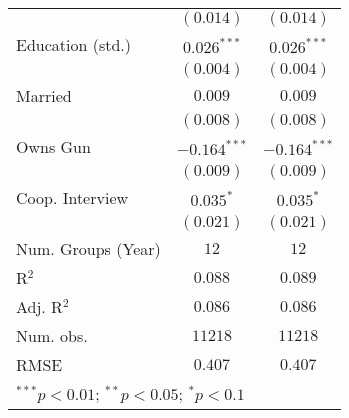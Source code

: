 \begin{table}
\begin{center}
\begin{tabular}{l c c}
                        & $(0.014)$      & $(0.014)$      \\
Education (std.)        & $0.026^{***}$  & $0.026^{***}$  \\
                        & $(0.004)$      & $(0.004)$      \\
Married                 & $0.009$        & $0.009$        \\
                        & $(0.008)$      & $(0.008)$      \\
Owns Gun                & $-0.164^{***}$ & $-0.164^{***}$ \\
                        & $(0.009)$      & $(0.009)$      \\
Coop. Interview         & $0.035^{*}$    & $0.035^{*}$    \\
                        & $(0.021)$      & $(0.021)$      \\
\midrule
Num. Groups (Year)      & $12$           & $12$           \\
R$^2$                   & $0.088$        & $0.089$        \\
Adj. R$^2$              & $0.086$        & $0.086$        \\
Num. obs.               & $11218$        & $11218$        \\
RMSE                    & $0.407$        & $0.407$        \\
\bottomrule
\multicolumn{3}{l}{\scriptsize{$^{***}p<0.01$; $^{**}p<0.05$; $^{*}p<0.1$}}
\end{tabular}
\label{table_ate_treat_20+_obs}
\end{center}
\end{table}
